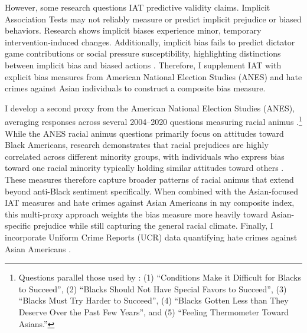However, some research questions IAT predictive validity claims. Implicit Association Tests may not reliably measure or predict implicit prejudice or biased behaviors. Research shows implicit biases experience minor, temporary intervention-induced changes. Additionally, implicit bias fails to predict dictator game contributions or social pressure susceptibility, highlighting distinctions between implicit bias and biased actions \autocite{arkesAttributionsImplicitPrejudice2004,forscherMetaanalysisProceduresChange2019,leeDoesImplicitBias2018}. Therefore, I supplement IAT with explicit bias measures from American National Election Studies (ANES) and hate crimes against Asian individuals to construct a composite bias measure.

I develop a second proxy from the American National Election Studies (ANES), averaging responses across several 2004--2020 questions measuring racial animus \autocite{anes2021}.\footnote{Questions parallel those used by \textcite{charlesPrejudiceWagesEmpirical2008}: (1) ``Conditions Make it Difficult for Blacks to Succeed'', (2) ``Blacks Should Not Have Special Favors to Succeed'', (3) ``Blacks Must Try Harder to Succeed'', (4) ``Blacks Gotten Less than They Deserve Over the Past Few Years'', and (5) ``Feeling Thermometer Toward Asians.''} While the ANES racial animus questions primarily focus on attitudes toward Black Americans, research demonstrates that racial prejudices are highly correlated across different minority groups, with individuals who express bias toward one racial minority typically holding similar attitudes toward others \autocite{almasalkhi2023links, mora2020antiblackness}. These measures therefore capture broader patterns of racial animus that extend beyond anti-Black sentiment specifically. When combined with the Asian-focused IAT measures and hate crimes against Asian Americans in my composite index, this multi-proxy approach weights the bias measure more heavily toward Asian-specific prejudice while still capturing the general racial climate. Finally, I incorporate Uniform Crime Reports (UCR) data quantifying hate crimes against Asian Americans \autocite{ucrbook}.

